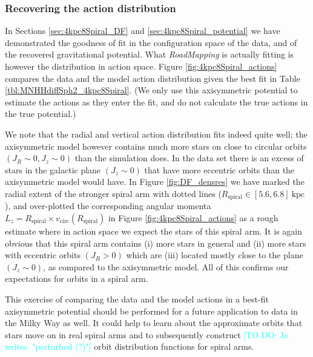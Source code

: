\documentclass[iop,revtex4,numberedappendix,appendixfloats]{emulateapj}
\newcommand{\RM}{{\sl RoadMapping}}
\newcommand{\Jo}[1]{\textcolor{Cyan}{#1}}
\begin{document}
\subsubsection{Recovering the action distribution}

In Sections \ref{sec:4kpc8Spiral_DF} and \ref{sec:4kpc8Spiral_potential} we have demonstrated the goodness of fit in the configuration space of the data, and of the recovered gravitational potential. What \RM{} is actually fitting is however the distribution in action space. Figure \ref{fig:4kpc8Spiral_actions} compares the data and the model action distribution given the best fit  in Table \ref{tbl:MNHHdiffSph2_4kpc8Spiral}. (We only use this axisymmetric potential to estimate the actions as they enter the fit, and do not calculate the true actions in the true potential.)

We note that the radial and vertical action distribution fits indeed quite well; the axisymmetric model however contains much more stars on close to circular orbits $(J_R \sim 0,J_z \sim 0)$ than the simulation does. In the data set there is an excess of stars in the galactic plane $(J_z\sim0)$ that have more eccentric orbits  than the axisymmetric model would have. In Figure \ref{fig:DF_densres} we have marked the radial extent of the stronger spiral arm with dotted lines ($R_\text{spiral} \in [5.6,6.8]~\text{kpc}$), and over-plotted the corresponding angular momenta $L_z = R_\text{spiral} \times v_\text{circ}(R_\text{spiral})$ in Figure \ref{fig:4kpc8Spiral_actions} as a rough estimate where in action space we expect the stars of this spiral arm. It is again obvious that this spiral arm contains (i) more stars in general and (ii) more stars with eccentric orbits  $(J_R>0)$ which are (iii) located mostly close to the plane $(J_z\sim0)$, as compared to the axisymmetric model. All of this confirms our expectations for orbits in a spiral arm. 

This exercise of comparing the data and the model actions in a best-fit axisymmetric potential should be performed for a future application to data in the Milky Way as well. It could help to learn about the approximate orbits that stars move on in real spiral arms and to subsequently construct \Jo{[TO DO: Jo writes: "perturbed (?)"]} orbit distribution functions for spiral arms.
\end{document}
